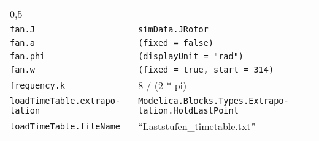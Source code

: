 \begin{longtable}[]{@{}ll@{}}
\begin{minipage}[t]{0.63\columnwidth}
0,5\strut
\end{minipage}\tabularnewline
\begin{minipage}[t]{0.31\columnwidth}\raggedright
\texttt{fan.J}\strut
\end{minipage} & \begin{minipage}[t]{0.63\columnwidth}\raggedright
\texttt{simData.JRotor}\strut
\end{minipage}\tabularnewline
\begin{minipage}[t]{0.31\columnwidth}\raggedright
\texttt{fan.a}\strut
\end{minipage} & \begin{minipage}[t]{0.63\columnwidth}\raggedright
\texttt{(fixed\ =\ false)}\strut
\end{minipage}\tabularnewline
\begin{minipage}[t]{0.31\columnwidth}\raggedright
\texttt{fan.phi}\strut
\end{minipage} & \begin{minipage}[t]{0.63\columnwidth}\raggedright
\texttt{(displayUnit\ =\ "rad")}\strut
\end{minipage}\tabularnewline
\begin{minipage}[t]{0.31\columnwidth}\raggedright
\texttt{fan.w}\strut
\end{minipage} & \begin{minipage}[t]{0.63\columnwidth}\raggedright
\texttt{(fixed\ =\ true,\ start\ =\ 314)}\strut
\end{minipage}\tabularnewline
\begin{minipage}[t]{0.31\columnwidth}\raggedright
\texttt{frequency.k}\strut
\end{minipage} & \begin{minipage}[t]{0.63\columnwidth}\raggedright
8 / (2 * pi)\strut
\end{minipage}\tabularnewline
\begin{minipage}[t]{0.31\columnwidth}\raggedright
\texttt{loadTimeTable.extra­po­lation}\strut
\end{minipage} & \begin{minipage}[t]{0.63\columnwidth}\raggedright
\texttt{Modelica.­Blocks.­Types.­Extra­po­lation.­HoldLastPoint}\strut
\end{minipage}\tabularnewline
\begin{minipage}[t]{0.31\columnwidth}\raggedright
\texttt{loadTimeTable.fileName}\strut
\end{minipage} & \begin{minipage}[t]{0.63\columnwidth}\raggedright
``Laststufen\_timetable.txt''\strut

\end{minipage}
\end{longtable}
